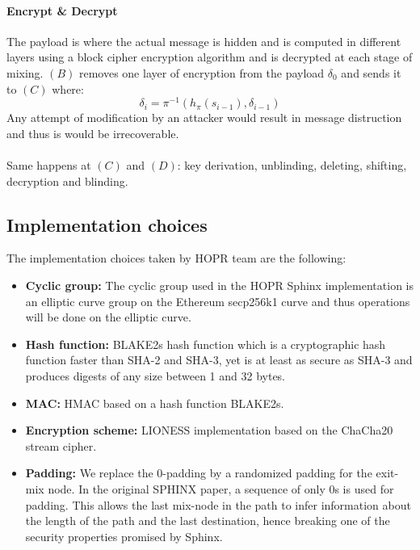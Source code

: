 \paragraph{Encrypt \& Decrypt}
The payload is where the actual message is hidden and is computed in different layers using a block cipher encryption algorithm and is decrypted at each stage of mixing. $(B)$ removes one layer of encryption from the payload $\delta_0$ and sends it to $(C)$ where:
$$\delta_i=\pi^{-1}(h_{\pi}(s_{i-1}), \delta_{i-1})$$
Any attempt of modification by an attacker would result in message distruction and thus is would be irrecoverable. 
\\~\\Same happens at $(C)$ and $(D)$: key derivation, unblinding, deleting, shifting, decryption and blinding. 

\subsection*{Implementation choices}
The implementation choices taken by HOPR team are the following:
\begin{itemize}
    \item \textbf{Cyclic group:} The cyclic group used in the HOPR Sphinx implementation is an elliptic curve group on the Ethereum secp256k1 curve and thus operations will be done on the elliptic curve.
    \item \textbf{Hash function:} BLAKE2s hash function which is a cryptographic hash function faster than SHA-2 and SHA-3, yet is at least as secure as SHA-3 and produces digests of any size between 1 and 32 bytes.
    \item \textbf{MAC:} HMAC based on a hash function BLAKE2s.
    \item \textbf{Encryption scheme:} LIONESS implementation based on the ChaCha20 stream cipher.
    \item \textbf{Padding:} We replace the 0-padding by a randomized padding for the exit-mix node. In the original SPHINX paper, a sequence of only 0s is used for padding. This allows the last mix-node in the path to infer information about the length of the path and the last destination, hence breaking one of the security properties promised by Sphinx.
\end{itemize}





